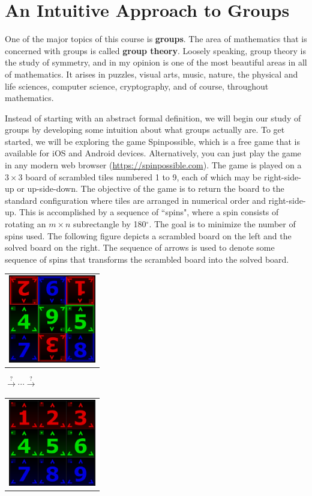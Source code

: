 \chapter{An Intuitive Approach to Groups}
\label{chapter:intuitive_approach_groups}
\thispagestyle{empty}

One of the major topics of this course is \textbf{groups}.  The area of mathematics that is concerned with groups is called \textbf{group theory}. Loosely speaking, group theory is the study of symmetry, and in my opinion is one of the most beautiful areas in all of mathematics. It arises in puzzles, visual arts, music, nature, the physical and life sciences, computer science, cryptography, and of course, throughout mathematics.

Instead of starting with an abstract formal definition, we will begin our study of groups by developing some intuition about what groups actually are.  To get started, we will be exploring the game Spinpossible\texttrademark, which is a free game that is available for iOS and Android devices. Alternatively, you can just play the game in any modern web browser (\url{https://spinpossible.com}).  The game is played on a $3\times 3$ board of scrambled tiles numbered 1 to 9, each of which may be right-side-up or up-side-down. The objective of the game is to return the board to the standard configuration where tiles are arranged in numerical order and right-side-up. This is accomplished by a sequence of ``spins", where a spin consists of rotating an $m\times n$ subrectangle by 180$^\circ$. The goal is to minimize the number of spins used.  The following figure depicts a scrambled board on the left and the solved board on the right.  The sequence of arrows is used to denote some sequence of spins that transforms the scrambled board into the solved board.

\begin{center}
\begin{tabular}{c}\includegraphics[width=1.5in]{scramble1.PNG}\end{tabular}
{\large $\xrightarrow{?} \cdots \xrightarrow{?}$}
\begin{tabular}{c}\includegraphics[width=1.5in]{scramble4.PNG}\end{tabular}
\end{center}

